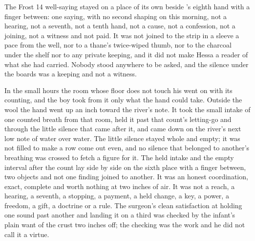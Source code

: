 The Frost 14 well-saying stayed on a place of its own beside 's eighth hand with a finger between: one saying, with no second shaping on this morning, not a hearing, not a seventh, not a tenth hand, not a cause, not a confession, not a joining, not a witness and not paid. It was not joined to the strip in a sleeve a pace from the well, nor to a thane's twice-wiped thumb, nor to the charcoal under the shelf nor to any private keeping, and it did not make Hessa a reader of what she had carried. Nobody stood anywhere to be asked, and the silence under the boards was a keeping and not a witness.

In the small hours the room whose floor does not touch his went on with its counting, and the boy took from it only what the hand could take. Outside the wool the hand went up an inch toward the river's note. It took the small intake of one counted breath from that room, held it past that count's letting-go and through the little silence that came after it, and came down on the river's next low note of water over water. The little silence stayed whole and empty; it was not filled to make a row come out even, and no silence that belonged to another's breathing was crossed to fetch a figure for it. The held intake and the empty interval after the count lay side by side on the sixth place with a finger between, two objects and not one finding joined to another. It was an honest coordination, exact, complete and worth nothing at two inches of air. It was not a reach, a hearing, a seventh, a stopping, a payment, a held change, a key, a power, a freedom, a gift, a doctrine or a rule. The surgeon's clean satisfaction at holding one sound past another and landing it on a third was checked by the infant's plain want of the crust two inches off; the checking was the work and he did not call it a virtue.

